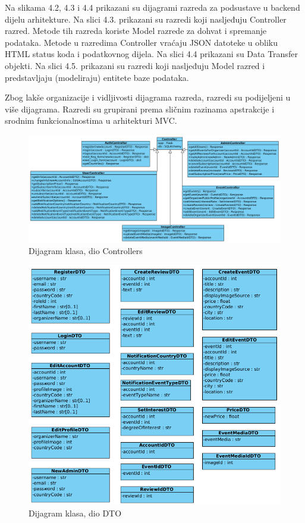 			\textit{}

			Na slikama 4.2, 4.3 i 4.4 prikazani su dijagrami razreda za podsustave u backend dijelu arhitekture. Na slici 4.3. prikazani su razredi koji nasljeđuju Controller razred. Metode tih razreda koriste Model razrede za dohvat i spremanje podataka. Metode u razredima Controller vraćaju JSON datoteke u obliku HTML status koda i podatkovnog dijela. Na slici 4.4 prikazani su Data Transfer objekti. Na slici 4.5. prikazani su razredi koji nasljeđuju Model razred i predstavljaju (modeliraju) entitete baze podataka.
			
			Zbog lakše organizacije i vidljivosti dijagrama razreda, razredi su podijeljeni u više dijagrama. Razredi su grupirani prema sličnim razinama apstrakcije i srodnim funkcionalnostima u arhitekturi MVC.
			
			\begin{figure}[htbp]
				\centering
				\includegraphics[width=1\textwidth]{dijagrami/dijagram_mvc_controllers.png}
				\caption{Dijagram klasa, dio Controllers}
			\label{fig:my_image}
			\end{figure}

			\newpage

			\begin{figure}[htbp]
				\centering
				\includegraphics[width=1\textwidth]{dijagrami/dijagram_mvc_dto.png}
				\caption{Dijagram klasa, dio DTO}
			\label{fig:my_image}
			\end{figure}

